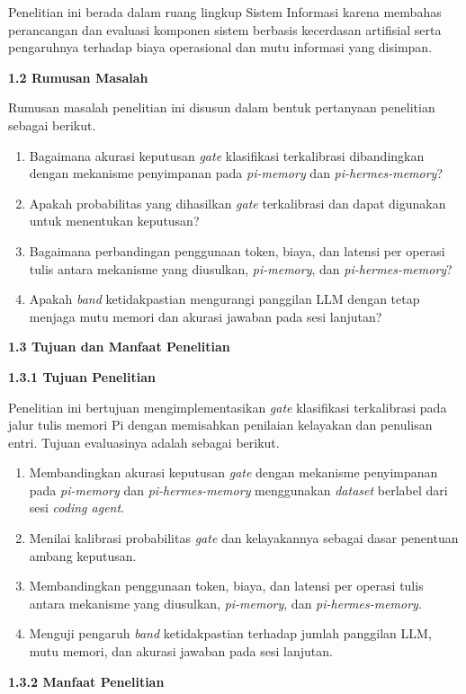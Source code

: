 \documentclass[12pt,a4paper]{article}
\newcommand{\asing}[1]{\textit{#1}}
\newcommand{\pim}{\textit{pi-memory}}
\newcommand{\phm}{\textit{pi-hermes-memory}}
\newcommand{\subbab}[2]{%
  \par\vspace{0.8em}\phantomsection\label{#2}%
  \noindent\textbf{#1}\par\nopagebreak\vspace{0.3em}}
\newcommand{\subsubbab}[2]{%
  \par\vspace{0.5em}\phantomsection\label{#2}%
  \noindent\textbf{#1}\par\nopagebreak\vspace{0.2em}}
\begin{document}
Penelitian ini berada dalam ruang lingkup Sistem Informasi karena membahas perancangan dan evaluasi komponen sistem berbasis kecerdasan artifisial serta pengaruhnya terhadap biaya operasional dan mutu informasi yang disimpan.

\subbab{1.2 Rumusan Masalah}{sec:1.2}

Rumusan masalah penelitian ini disusun dalam bentuk pertanyaan penelitian sebagai berikut.
\begin{enumerate}[leftmargin=1.25cm]
\item Bagaimana akurasi keputusan \asing{gate} klasifikasi terkalibrasi dibandingkan dengan mekanisme penyimpanan pada \pim{} dan \phm{}?
\item Apakah probabilitas yang dihasilkan \asing{gate} terkalibrasi dan dapat digunakan untuk menentukan keputusan?
\item Bagaimana perbandingan penggunaan token, biaya, dan latensi per operasi tulis antara mekanisme yang diusulkan, \pim{}, dan \phm{}?
\item Apakah \asing{band} ketidakpastian mengurangi panggilan LLM dengan tetap menjaga mutu memori dan akurasi jawaban pada sesi lanjutan?
\end{enumerate}

\subbab{1.3 Tujuan dan Manfaat Penelitian}{sec:1.3}

\subsubbab{1.3.1 Tujuan Penelitian}{sec:1.3.1}

Penelitian ini bertujuan mengimplementasikan \asing{gate} klasifikasi terkalibrasi pada jalur tulis memori Pi dengan memisahkan penilaian kelayakan dan penulisan entri. Tujuan evaluasinya adalah sebagai berikut.
\begin{enumerate}[leftmargin=1.25cm]
\item Membandingkan akurasi keputusan \asing{gate} dengan mekanisme penyimpanan pada \pim{} dan \phm{} menggunakan \asing{dataset} berlabel dari sesi \asing{coding agent}.
\item Menilai kalibrasi probabilitas \asing{gate} dan kelayakannya sebagai dasar penentuan ambang keputusan.
\item Membandingkan penggunaan token, biaya, dan latensi per operasi tulis antara mekanisme yang diusulkan, \pim{}, dan \phm{}.
\item Menguji pengaruh \asing{band} ketidakpastian terhadap jumlah panggilan LLM, mutu memori, dan akurasi jawaban pada sesi lanjutan.
\end{enumerate}

\subsubbab{1.3.2 Manfaat Penelitian}{sec:1.3.2}
\end{document}
